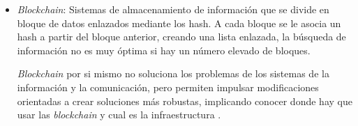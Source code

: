 \begin{itemize}
	\item \textit{Blockchain}: Sistemas de almacenamiento de información que se divide en bloque de datos enlazados mediante los hash. A cada bloque se le asocia un hash a partir del bloque anterior, creando una lista enlazada, la búsqueda de información no es muy óptima si hay un número elevado de bloques. %
	
\textit{Blockchain} por si mismo no soluciona los problemas de los sistemas de la información y la comunicación, pero permiten impulsar modificaciones orientadas a crear soluciones más robustas, implicando conocer donde hay que usar las \textit{blockchain} y cual es la infraestructura \cite{blockchain}.


\end{itemize}


